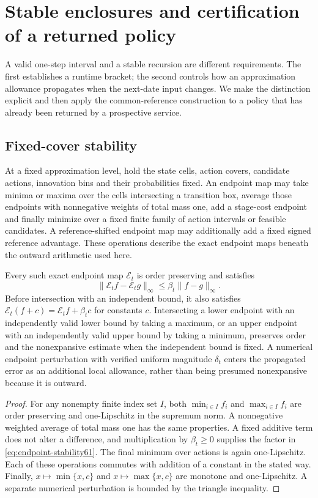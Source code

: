 \section{Stable enclosures and certification of a returned policy}\label{sec:stability61}
A valid one-step interval and a stable recursion are different requirements. The first establishes a runtime bracket; the second controls how an approximation allowance propagates when the next-date input changes. We make the distinction explicit and then apply the common-reference construction to a policy that has already been returned by a prospective service.

\subsection{Fixed-cover stability}
At a fixed approximation level, hold the state cells, action covers, candidate actions, innovation bins and their probabilities fixed. An endpoint map may take minima or maxima over the cells intersecting a transition box, average those endpoints with nonnegative weights of total mass one, add a stage-cost endpoint and finally minimize over a fixed finite family of action intervals or feasible candidates. A reference-shifted endpoint map may additionally add a fixed signed reference advantage. These operations describe the exact endpoint maps beneath the outward arithmetic used here.

\begin{lemma}\label{lem:stable61}
Every such exact endpoint map $\mathscr E_t$ is order preserving and satisfies
\begin{equation}\label{eq:endpoint-stability61}
 \|\mathscr E_t f-\mathscr E_t g\|_\infty
       \le\beta_t\|f-g\|_\infty.
\end{equation}
Before intersection with an independent bound, it also satisfies
$\mathscr E_t(f+c)=\mathscr E_t f+\beta_t c$ for constants $c$. Intersecting a lower endpoint with an independently valid lower bound by taking a maximum, or an upper endpoint with an independently valid upper bound by taking a minimum, preserves order and the nonexpansive estimate when the independent bound is fixed. A numerical endpoint perturbation with verified uniform magnitude $\delta_t$ enters the propagated error as an additional local allowance, rather than being presumed nonexpansive because it is outward.
\end{lemma}
\begin{proof}
For any nonempty finite index set $I$, both $\min_{i\in I}f_i$ and $\max_{i\in I}f_i$ are order preserving and one-Lipschitz in the supremum norm. A nonnegative weighted average of total mass one has the same properties. A fixed additive term does not alter a difference, and multiplication by $\beta_t\ge0$ supplies the factor in \eqref{eq:endpoint-stability61}. The final minimum over actions is again one-Lipschitz. Each of these operations commutes with addition of a constant in the stated way. Finally, $x\mapsto\min\{x,c\}$ and $x\mapsto\max\{x,c\}$ are monotone and one-Lipschitz. A separate numerical perturbation is bounded by the triangle inequality.
\end{proof}


